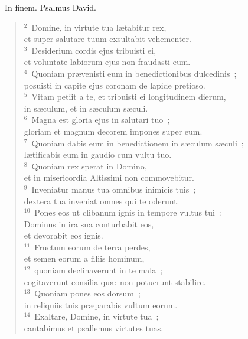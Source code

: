~\lettrine[lines=10,image=true,loversize=0.05,lraise=-0.03]{I}{}n finem. Psalmus David.
\begin{flushleft}\begin{verse}\vspace{6pt}${}^{2}$~Domine, in virtute tua l\ae tabitur rex,\\ et super salutare tuum exsultabit vehementer.\\
${}^{3}$~Desiderium cordis ejus tribuisti ei,\\ et voluntate labiorum ejus non fraudasti eum.\\
${}^{4}$~Quoniam pr\ae venisti eum in benedictionibus dulcedinis~;\\ posuisti in capite ejus coronam de lapide pretioso.\\
${}^{5}$~Vitam petiit a te, et tribuisti ei longitudinem dierum,\\ in s\ae culum, et in s\ae culum s\ae culi.\\
${}^{6}$~Magna est gloria ejus in salutari tuo~;\\ gloriam et magnum decorem impones super eum.\\
${}^{7}$~Quoniam dabis eum in benedictionem in s\ae culum s\ae culi~;\\ l\ae tificabis eum in gaudio cum vultu tuo.\\
${}^{8}$~Quoniam rex sperat in Domino,\\ et in misericordia Altissimi non commovebitur.\\
${}^{9}$~Inveniatur manus tua omnibus inimicis tuis~;\\ dextera tua inveniat omnes qui te oderunt.\\
${}^{10}$~Pones eos ut clibanum ignis in tempore vultus tui~:\\ Dominus in ira sua conturbabit eos,\\ et devorabit eos ignis.\\
${}^{11}$~Fructum eorum de terra perdes,\\ et semen eorum a filiis hominum,\\
${}^{12}$~quoniam declinaverunt in te mala~;\\ cogitaverunt consilia qu\ae\ non potuerunt stabilire.\\
${}^{13}$~Quoniam pones eos dorsum~;\\ in reliquiis tuis pr\ae parabis vultum eorum.\\
${}^{14}$~Exaltare, Domine, in virtute tua~;\\ cantabimus et psallemus virtutes tuas.\end{verse}\end{flushleft}


